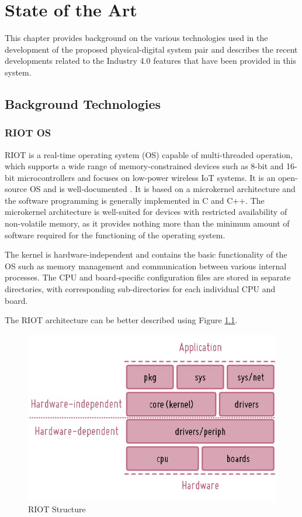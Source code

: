 \chapter{State of the Art}
\label{ch:State of the Art}
This chapter provides background on the various technologies used in the development of the proposed physical-digital system pair and describes the recent developments related to the Industry 4.0 features that have been provided in this system.
\section{Background Technologies}
\subsection{RIOT OS}
RIOT is a real-time operating system (OS) capable of multi-threaded operation, which supports a wide range of memory-constrained devices such as 8-bit and 16-bit microcontrollers and focuses on low-power wireless \acrshort{IoT} systems. It is an open-source OS and is well-documented \cite{Baccelli_RIOT_An_Open_2018}. It is based on a microkernel architecture and the software programming is generally implemented in C and C++. The microkernel architecture is well-suited for devices with restricted availability of non-volatile memory, as it provides nothing more than the minimum amount of software required for the functioning of the operating system. 

The kernel is hardware-independent and contains the basic functionality of the OS such as memory management and communication between various internal processes. The \acrshort{CPU} and board-specific configuration files are stored in separate directories, with corresponding sub-directories for each individual \acrshort{CPU} and board.

The RIOT architecture can be better described using Figure \ref{fig:structure}.
\begin{figure}
    \centering
    \includegraphics[scale=0.8]{images/RIOT_Structure.jpg}
    \caption{RIOT Structure \cite{Baccelli_RIOT_An_Open_2018}}
    \label{fig:structure}
\end{figure}

